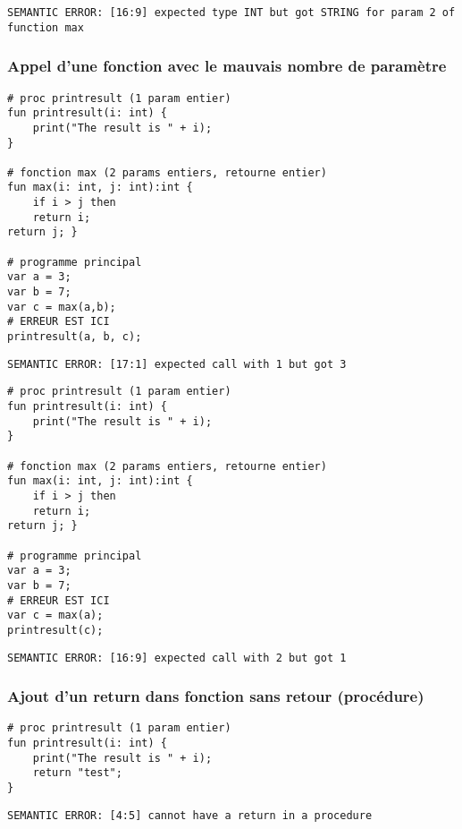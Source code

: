 \documentclass[fleqn]{article}
\begin{document}
    \begin{lstlisting}
SEMANTIC ERROR: [16:9] expected type INT but got STRING for param 2 of function max
    \end{lstlisting}

    \subsubsection*{Appel d'une fonction avec le mauvais nombre de paramètre}
    \begin{lstlisting}
# proc printresult (1 param entier)
fun printresult(i: int) {
    print("The result is " + i);
}

# fonction max (2 params entiers, retourne entier)
fun max(i: int, j: int):int {
    if i > j then
    return i;
return j; }

# programme principal
var a = 3;
var b = 7;
var c = max(a,b);
# ERREUR EST ICI
printresult(a, b, c);
    \end{lstlisting}

    \begin{lstlisting}
SEMANTIC ERROR: [17:1] expected call with 1 but got 3
    \end{lstlisting}

    \begin{lstlisting}
# proc printresult (1 param entier)
fun printresult(i: int) {
    print("The result is " + i);
}

# fonction max (2 params entiers, retourne entier)
fun max(i: int, j: int):int {
    if i > j then
    return i;
return j; }

# programme principal
var a = 3;
var b = 7;
# ERREUR EST ICI
var c = max(a);
printresult(c);
    \end{lstlisting}
        
    \begin{lstlisting}
SEMANTIC ERROR: [16:9] expected call with 2 but got 1
    \end{lstlisting}

    \subsubsection*{Ajout d'un return dans fonction sans retour (procédure)}
    \begin{lstlisting}
# proc printresult (1 param entier)
fun printresult(i: int) {
    print("The result is " + i);
    return "test";
}
    \end{lstlisting}
                
    \begin{lstlisting}
SEMANTIC ERROR: [4:5] cannot have a return in a procedure
    \end{lstlisting}
\end{document}
